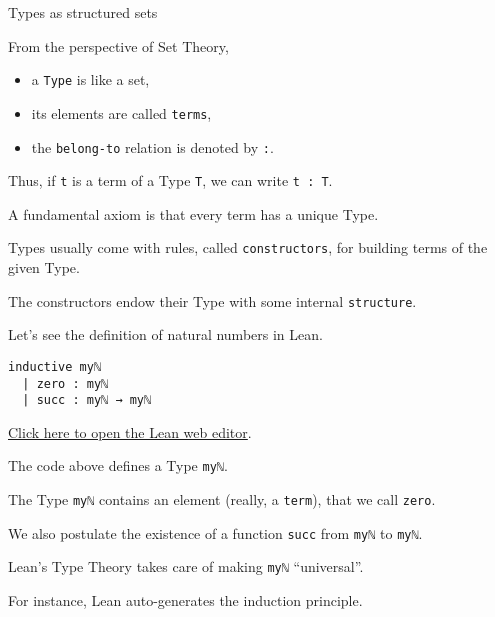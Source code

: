 \documentclass{beamer}
\begin{document}
\begin{frame}[fragile]{Types as structured sets}

From the perspective of Set Theory,
\begin{itemize}
\setlength\itemsep{-18pt}
\item
  a {\color{violet}\verb`Type`} is like a set,
\setlength\itemsep{-18pt}
\item
  its elements are called {\color{violet}\verb`terms`},
\setlength\itemsep{-18pt}
\item
  the {\color{violet}\verb`belong-to`} relation is denoted by {\color{violet}\verb`:`}.
\end{itemize}
\bigskip

Thus, if {\color{violet}\verb`t`} is a term of a Type {\color{violet}\verb`T`}, we can write {\color{violet}\verb`t : T`}.
\bigskip

A fundamental axiom is that every term has a unique Type.
\bigskip

Types usually come with rules, called {\color{violet}\verb`constructors`}, for building terms of the given Type.
\bigskip

The constructors endow their Type with some internal {\color{violet}\verb`structure`}.
\bigskip

Let's see the definition of natural numbers in Lean.
\end{frame}

\begin{frame}[fragile]

\begin{verbatim}
inductive myℕ
  | zero : myℕ
  | succ : myℕ → myℕ
\end{verbatim}
{\small{\href{https://leanprover-community.github.io/lean-web-editor/#code=inductive%20my%E2%84%95%0A%20%20%7C%20zero%20%3A%20my%E2%84%95%0A%20%20%7C%20succ%20%3A%20my%E2%84%95%20%E2%86%92%20my%E2%84%95%0A%0A%23print%20prefix%20my%E2%84%95%0A}{Click here to open the Lean web editor}.}}
\bigskip

The code above defines a Type {\color{violet}\verb`myℕ`}.
\bigskip

The Type {\color{violet}\verb`myℕ`} contains an element (really, a {\color{violet}\verb`term`}), that we call {\color{violet}\verb`zero`}.
\bigskip

We also postulate the existence of a function {\color{violet}\verb`succ`} from {\color{violet}\verb`myℕ`} to {\color{violet}\verb`myℕ`}.
\bigskip

Lean's Type Theory takes care of making {\color{violet}\verb`myℕ`} ``universal''.
\bigskip

For instance, Lean auto-generates the induction principle.
\end{frame}
\end{document}
